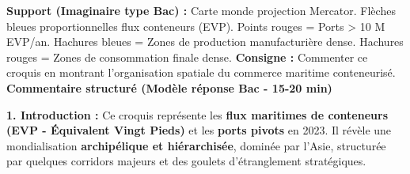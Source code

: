 \documentclass[11pt]{article}
\begin{document}
\begin{exoresolu}
    \textbf{Support (Imaginaire type Bac) :} Carte monde projection Mercator. Flèches bleues proportionnelles flux conteneurs (EVP). Points rouges = Ports > 10 M EVP/an. Hachures bleues = Zones de production manufacturière dense. Hachures rouges = Zones de consommation finale dense.
    \textbf{Consigne :} Commenter ce croquis en montrant l'organisation spatiale du commerce maritime conteneurisé.
    \tcblower
    \textbf{Commentaire structuré (Modèle réponse Bac - 15-20 min)}
    
    \textbf{1. Introduction :} Ce croquis représente les \textbf{flux maritimes de conteneurs (EVP - Équivalent Vingt Pieds)} et les \textbf{ports pivots} en 2023. Il révèle une mondialisation \textbf{archipélique et hiérarchisée}, dominée par l'Asie, structurée par quelques corridors majeurs et des goulets d'étranglement stratégiques.
    

\end{exoresolu}
\end{document}

